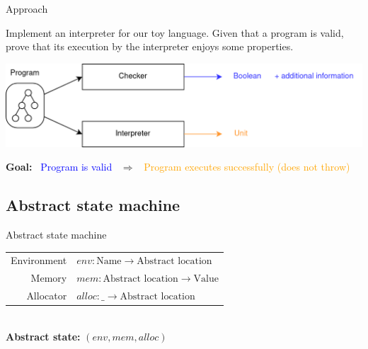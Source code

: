 \documentclass{EESD}
\begin{document}
\begin{frame}{Approach}

    \begin{block}{}
        Implement an interpreter for our toy language. Given that a program is valid, prove that its execution by the interpreter enjoys some properties.
    \end{block}


    \vspace{0.2cm}

    \begin{center}
        \includegraphics[height = 0.4\textheight]{Figures/approach.png}
    \end{center}

    \vspace{0.2cm}

    \textbf{Goal:} \  \textcolor{blue}{Program is valid} \ $\Rightarrow$ \  \textcolor{orange}{Program executes successfully (does not throw)}

\end{frame}

\subsection{Abstract state machine}

\begin{frame}{Abstract state machine}
    \begin{tabular}{rl}
        Environment & \(env: \text{Name} \to \text{Abstract location}\)  \\
        Memory      & \(mem: \text{Abstract location} \to \text{Value}\) \\
        Allocator   & \(alloc: \_ \to \text{Abstract location}\)         \\
    \end{tabular}\\
    \vspace{0.5cm}
    \textbf{Abstract state:} \((env, mem, alloc)\)
\end{frame}
\end{document}
